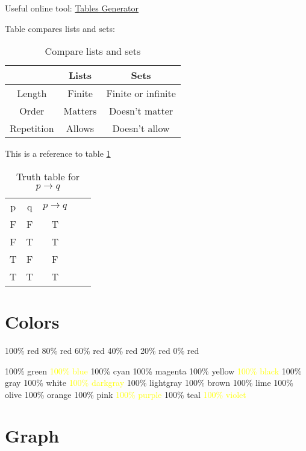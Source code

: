 \documentclass[12pt, letterpaper, oneside]{article}
\begin{document}
Useful online tool: \href{https://www.tablesgenerator.com/}{Tables Generator}

Table compares lists and sets:
\begin{table}[H]
\centering
\begin{tabular}{||c c c ||}
 \hline
   & Lists & Sets \\ [0.5ex]
 \hline
 \hline
 Length & Finite & Finite or infinite \\
 Order & Matters & Doesn't matter \\
 Repetition & Allows & Doesn't allow \\ [1ex]
 \hline
\end{tabular}
\caption{Compare lists and sets}
\label{table:lists_sets_comp}
\end{table}

This is a reference to table \ref{table:lists_sets_comp}

\begin{table}[H]
  \centering
  \begin{tabular}{|c|c|c|ll}
  \cline{1-3}
  p & q & $p \rightarrow q$ &  &  \\ [1ex] \cline{1-3}
  F & F & T                 &  &  \\ [0.5ex] \cline{1-3}
  F & T & T                 &  &  \\ [0.5ex] \cline{1-3}
  T & F & F                 &  &  \\ [0.5ex] \cline{1-3}
  T & T & T                 &  &  \\ [0.5ex] \cline{1-3}
  \end{tabular}
  \caption{Truth table for $p \rightarrow q$}
\end{table}

\section{Colors}

\colorbox{red!100}{100\% red}
\colorbox{red!80}{80\% red}
\colorbox{red!60}{60\% red}
\colorbox{red!40}{40\% red}
\colorbox{red!20}{20\% red}
\colorbox{red!0}{0\% red}

\colorbox{green!100}{100\% green}
\colorbox{blue!100}{\textcolor{yellow}{100\% blue}}
\colorbox{cyan!100}{100\% cyan}
\colorbox{magenta!100}{100\% magenta}
\colorbox{yellow!100}{100\% yellow}
\colorbox{black!100}{\textcolor{yellow}{100\% black}}
\colorbox{gray!100}{100\% gray}
\colorbox{white!100}{100\% white}
\colorbox{darkgray!100}{\textcolor{yellow}{100\% darkgray}}
\colorbox{lightgray!100}{100\% lightgray}
\colorbox{brown!100}{100\% brown}
\colorbox{lime!100}{100\% lime}
\colorbox{olive!100}{100\% olive}
\colorbox{orange!100}{100\% orange}
\colorbox{pink!100}{100\% pink}
\colorbox{purple!100}{\textcolor{yellow}{100\% purple}}
\colorbox{teal!100}{100\% teal}
\colorbox{violet!100}{\textcolor{yellow}{100\% violet}}

\section{Graph}

\end{document}
